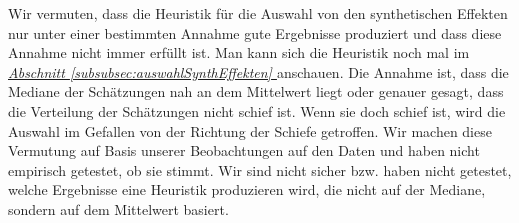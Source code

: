 \documentclass[12pt,a4paper,twoside]{scrartcl}
\numberwithin{equation}{section}
\newcommand{\refsec}[1]{\emph{\hyperref[#1]{Abschnitt \ref*{#1} }}}
\begin{document}
\noindent
Wir vermuten, dass die Heuristik für die Auswahl von den synthetischen Effekten nur unter einer bestimmten Annahme gute Ergebnisse produziert und dass diese Annahme nicht immer erfüllt ist. Man kann sich die Heuristik noch mal im \refsec{subsubsec:auswahlSynthEffekten} anschauen. Die Annahme ist, dass die Mediane der Schätzungen nah an dem Mittelwert liegt oder genauer gesagt, dass die Verteilung der Schätzungen nicht schief ist. Wenn sie doch schief ist, wird die Auswahl im Gefallen von der Richtung der Schiefe getroffen. Wir machen diese Vermutung auf Basis unserer Beobachtungen auf den Daten und haben nicht empirisch getestet, ob sie stimmt. Wir sind nicht sicher bzw. haben nicht getestet, welche Ergebnisse eine Heuristik produzieren wird, die nicht auf der Mediane, sondern auf dem Mittelwert basiert. 

\clearpage
	
\end{document}

